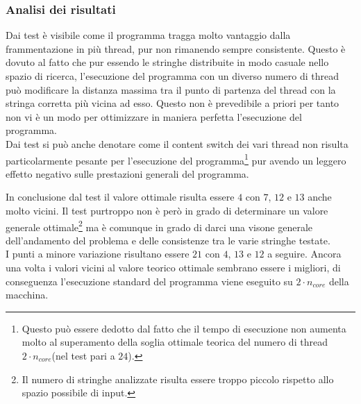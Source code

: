\documentclass{article}
\begin{document}
   \subsubsection{Analisi dei risultati}
   Dai test è visibile come il programma tragga molto vantaggio dalla frammentazione in più thread, pur non rimanendo sempre consistente. Questo è dovuto al fatto che pur essendo le stringhe distribuite in modo casuale nello spazio di ricerca, l'esecuzione del programma con un diverso numero di thread può modificare la distanza massima tra il punto di partenza del thread con la stringa corretta più vicina ad esso. Questo non è prevedibile a priori per tanto non vi è un modo per ottimizzare in maniera perfetta l'esecuzione del programma.\\

   Dai test si può anche denotare come il content switch dei vari thread non risulta particolarmente pesante per l'esecuzione del programma\footnote{Questo può essere dedotto dal fatto che il tempo di esecuzione non aumenta molto al superamento della soglia ottimale teorica del numero di thread $2 \cdot n_{core}$(nel test pari a $24$).} pur avendo un leggero effetto negativo sulle prestazioni generali del programma.
   \newpage %

   In conclusione dal test il valore ottimale risulta essere $4$ con $7$, $12$ e $13$ anche molto vicini. Il test purtroppo non è però in grado di determinare un valore generale ottimale\footnote{Il numero di stringhe analizzate risulta essere troppo piccolo rispetto allo spazio possibile di input.} ma è comunque in grado di darci una visone generale dell'andamento del problema e delle consistenze tra le varie stringhe testate.\\
   
   I punti a minore variazione risultano essere $21$ con $4$, $13$ e $12$ a seguire. Ancora una volta i valori vicini al valore teorico ottimale sembrano essere i migliori, di conseguenza l'esecuzione standard del programma viene eseguito su $2 \cdot n_{core}$ della macchina.
\end{document}
